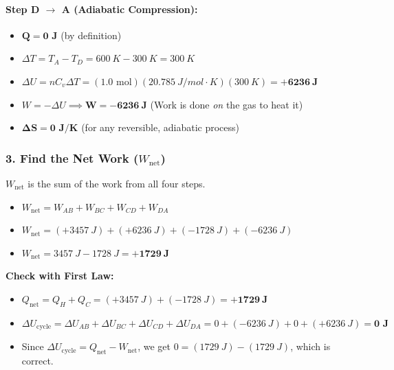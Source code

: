 \documentclass[article]{article}
\begin{document}
\paragraph{Step D $\to$ A (Adiabatic Compression):}
\begin{itemize}
    \item $\mathbf{Q = 0 \text{ J}}$ (by definition)
    \item $\Delta T = T_A - T_D = \SI{600}{K} - \SI{300}{K} = \SI{+300}{K}$
    \item $\Delta U = nC_v\Delta T = (1.0 \text{ mol})(\SI{20.785}{J/mol\cdot K})(\SI{+300}{K}) = \mathbf{+\SI{6236}{J}}$
    \item $W = -\Delta U \implies \mathbf{W = -\SI{6236}{J}}$ (Work is done \textit{on} the gas to heat it)
    \item $\mathbf{\Delta S = 0 \text{ J/K}}$ (for any reversible, adiabatic process)
\end{itemize}

\subsubsection{3. Find the Net Work ($W_{\text{net}}$)}
$W_{\text{net}}$ is the sum of the work from all four steps.
\begin{itemize}
    \item $W_{\text{net}} = W_{AB} + W_{BC} + W_{CD} + W_{DA}$
    \item $W_{\text{net}} = (+\SI{3457}{J}) + (+\SI{6236}{J}) + (-\SI{1728}{J}) + (-\SI{6236}{J})$
    \item $W_{\text{net}} = \SI{3457}{J} - \SI{1728}{J} = \mathbf{+\SI{1729}{J}}$
\end{itemize}
\textbf{Check with First Law:}
\begin{itemize}
    \item $Q_{\text{net}} = Q_H + Q_C = (+\SI{3457}{J}) + (-\SI{1728}{J}) = \mathbf{+\SI{1729}{J}}$
    \item $\Delta U_{\text{cycle}} = \Delta U_{AB} + \Delta U_{BC} + \Delta U_{CD} + \Delta U_{DA} = 0 + (-\SI{6236}{J}) + 0 + (+\SI{6236}{J}) = \mathbf{0 \text{ J}}$
    \item Since $\Delta U_{\text{cycle}} = Q_{\text{net}} - W_{\text{net}}$, we get $0 = (\SI{1729}{J}) - (\SI{1729}{J})$, which is correct.
\end{itemize}
\end{document}
